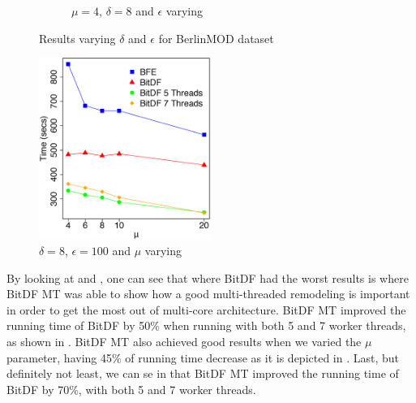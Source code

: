{\begin{figure}[h!]
\begin{subfigure}[t]{0.49\textwidth}
        \caption{$\mu = 4$, $\delta = 8$ and $\epsilon$ varying}
        \label{fig:berlinmod_complete_vary_g}
    \end{subfigure}
    \caption{Results varying $\delta$ and $\epsilon$ for BerlinMOD dataset}
    \label{fig:berlinmod_complete_results}
\end{figure}

\begin{figure}[h!]
    \centering
    \includegraphics[width=0.5\textwidth]{images/BerlinMOD_complete_varying_n.eps}
    \caption{$\delta = 8$, $\epsilon = 100$ and $\mu$ varying}
    \label{fig:berlinmod_complete_vary_n}
\end{figure}

By looking at  and , one can see that
where BitDF had the worst results is where BitDF MT was able to show how a good multi-threaded remodeling is important
in order to get the most out of multi-core architecture. BitDF MT improved the running time of BitDF by 50\% when
running with both 5 and 7 worker threads, as shown in . BitDF MT also achieved
good results when we varied the $\mu$ parameter, having 45\% of running time decrease as it is depicted in
. Last, but definitely not least, we can se in
 that BitDF MT improved the running time of BitDF by 70\%, with both 5 and 7
worker threads.

}
